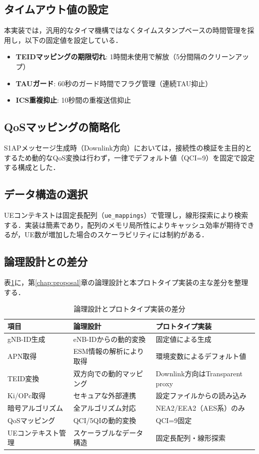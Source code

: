 \subsection{タイムアウト値の設定}
本実装では，汎用的なタイマ機構ではなくタイムスタンプベースの時間管理を採用し，以下の固定値を設定している．
\begin{itemize}
  \item \textbf{TEIDマッピングの期限切れ}: 1時間未使用で解放（5分間隔のクリーンアップ）
  \item \textbf{TAUガード}: 60秒のガード時間でフラグ管理（連続TAU抑止）
  \item \textbf{ICS重複抑止}: 10秒間の重複送信抑止
\end{itemize}

\subsection{QoSマッピングの簡略化}
S1APメッセージ生成時（Downlink方向）においては，接続性の検証を主目的とするため動的なQoS変換は行わず，一律でデフォルト値（QCI=9）を固定で設定する構成とした．

\subsection{データ構造の選択}
UEコンテキストは固定長配列（\texttt{ue\_mappings}）で管理し，線形探索により検索する．実装は簡素であり，配列のメモリ局所性によりキャッシュ効率が期待できるが，UE数が増加した場合のスケーラビリティには制約がある．

\subsection{論理設計との差分}
表\ref{tab:logical_vs_prototype}に，第\ref{chap:proposal}章の論理設計と本プロトタイプ実装の主な差分を整理する．

\begin{table}[htbp]
\centering
\caption{論理設計とプロトタイプ実装の差分}
\label{tab:logical_vs_prototype}
\begin{tabular}{|l|p{5cm}|p{5cm}|}
\hline
\textbf{項目} & \textbf{論理設計} & \textbf{プロトタイプ実装} \\
\hline
gNB-ID生成 & eNB-IDからの動的変換 & 固定値による生成 \\
\hline
APN取得 & ESM情報の解析により取得 & 環境変数によるデフォルト値 \\
\hline
TEID変換 & 双方向での動的マッピング & Downlink方向はTransparent proxy \\
\hline
Ki/OPc取得 & セキュアな外部連携 & 設定ファイルからの読み込み \\
\hline
暗号アルゴリズム & 全アルゴリズム対応 & NEA2/EEA2（AES系）のみ \\
\hline
QoSマッピング & QCI/5QIの動的変換 & QCI=9固定 \\
\hline
UEコンテキスト管理 & スケーラブルなデータ構造 & 固定長配列・線形探索 \\
\hline
\end{tabular}
\end{table}

